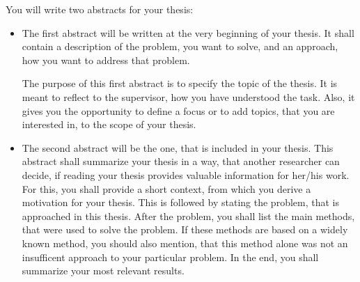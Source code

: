 
You will write two abstracts for your thesis:
\begin{itemize}
	\item The first abstract will be written at the very beginning of your thesis.
	       It shall contain a description of the problem, you want to solve, and an approach, how you want to address that problem.

	      The purpose of this first abstract is to specify the topic of the thesis.
	      It is meant to reflect to the supervisor, how you have understood the task.
	      Also, it gives you the opportunity to define a focus or to add topics, that you are interested in, to the scope of your thesis.
	\item The second abstract will be the one, that is included in your thesis.
	      This abstract shall summarize your thesis in a way, that another researcher can decide, if reading your thesis provides valuable information for her/his work.
	      For this, you shall provide a short context, from which you derive a motivation for your thesis.
	      This is followed by stating the problem, that is approached in this thesis.
	      After the problem, you shall list the main methods, that were used to solve the problem.
	      If these methods are based on a widely known method, you should also mention, that this method alone was not an insufficent approach to your particular problem.
	      In the end, you shall summarize your most relevant results.
\end{itemize}

